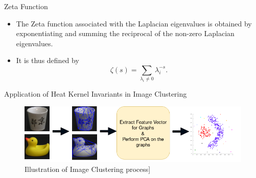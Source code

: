 \documentclass{beamer}
\begin{document}
\begin{frame}{Zeta Function}
	\begin{block}{}
	\begin{itemize}
	\item The Zeta function associated with the Laplacian eigenvalues is obtained by exponentiating and summing the reciprocal of the non-zero Laplacian eigenvalues. 
	\pause
	\vspace{0.5cm}
	\item It is thus defined by \cite{xiao2007kernel}
	\begin{equation}
	\zeta(s) = \sum_{\lambda_i \neq 0} \lambda_i ^{-s}.
	\end{equation} 
   \end{itemize}
\end{block}
\end{frame}



\begin{frame}{Application of Heat Kernel Invariants in Image Clustering}
	\begin{figure}[H]
		\centering
			\includegraphics[width= \textwidth]{images/GraphClustering.png}
			\caption{Illustration of Image Clustering process]}
	\end{figure}
	
\end{frame}
\end{document}
